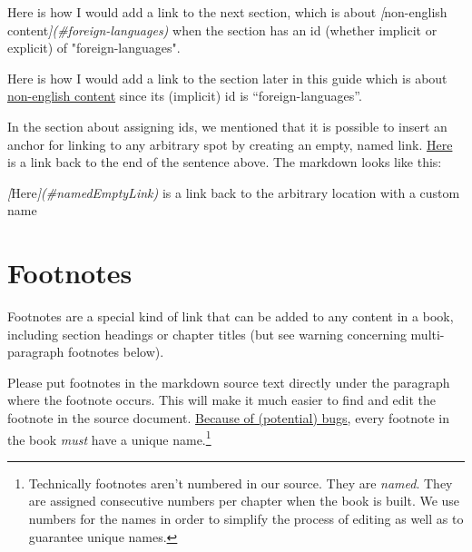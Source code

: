 \documentclass[
]{book}
\newenvironment{Shaded}{\begin{snugshade}}{\end{snugshade}}
\newcommand{\CommentTok}[1]{\textcolor[rgb]{0.56,0.35,0.01}{\textit{#1}}}
\newcommand{\NormalTok}[1]{#1}
\newcommand{\OtherTok}[1]{\textcolor[rgb]{0.56,0.35,0.01}{#1}}
\begin{document}
\begin{Shaded}
\begin{Highlighting}[]
\NormalTok{Here is how I would add a link to the next section, which is about }\CommentTok{[}\OtherTok{non{-}english content}\CommentTok{](\#foreign{-}languages)}\NormalTok{ when the section has an id (whether implicit or explicit) of "foreign{-}languages".}
\end{Highlighting}
\end{Shaded}

Here is how I would add a link to the section later in this guide which is about \protect\hyperlink{foreign-languages}{non-english content} since its (implicit) id is ``foreign-languages''.

In the section about assigning ids, we mentioned that it is possible to insert an anchor for linking to any arbitrary spot by creating an empty, named link. \protect\hyperlink{namedEmptyLink}{Here} is a link back to the end of the sentence above. The markdown looks like this:

\begin{Shaded}
\begin{Highlighting}[]
\CommentTok{[}\OtherTok{Here}\CommentTok{](\#namedEmptyLink)}\NormalTok{ is a link back to the arbitrary location with a custom name }
\end{Highlighting}
\end{Shaded}

\hypertarget{footnotes}{%
\section{Footnotes}\label{footnotes}}

Footnotes are a special kind of link that can be added to any content in a book, including section headings or chapter titles (but see warning concerning multi-paragraph footnotes below).

Please put footnotes in the markdown source text directly under the paragraph where the footnote occurs. This will make it much easier to find and edit the footnote in the source document. \href{https://community.rstudio.com/t/how-can-i-enable-the-file-scope-option/83741}{Because of (potential) bugs}, every footnote in the book \emph{must} have a unique name.\footnote{Technically footnotes aren't numbered in our source. They are \emph{named}. They are assigned consecutive numbers per chapter when the book is built. We use numbers for the names in order to simplify the process of editing as well as to guarantee unique names.}
\end{document}
